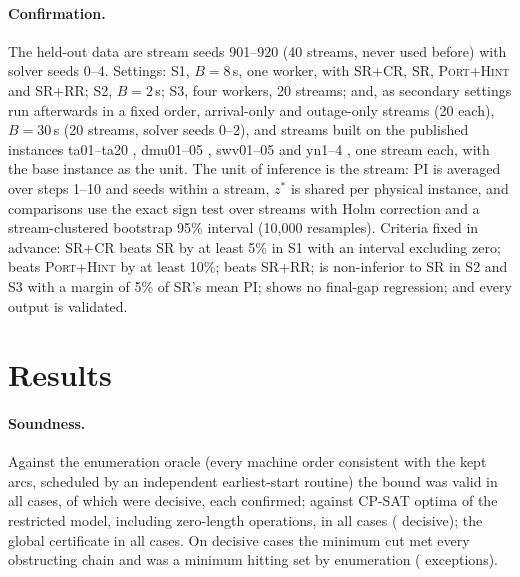 \documentclass[letterpaper]{article} %
\newcommand{\base}{\textsc{SR}}
\newcommand{\crm}{\textsc{SR+CR}}
\newcommand{\rr}{\textsc{SR+RR}}
\newcommand{\ph}{\textsc{Port+Hint}}
\begin{document}
\paragraph{Confirmation.} The held-out data are stream seeds 901--920 (40 streams, never used before) with solver seeds 0--4. Settings: S1, $B=8$\,s, one worker, with \crm, \base, \ph{} and \rr; S2, $B=2$\,s; S3, four workers, 20 streams; and, as secondary settings run afterwards in a fixed order, arrival-only and outage-only streams (20 each), $B=30$\,s (20 streams, solver seeds 0--2), and streams built on the published instances ta01--ta20 \citep{taillard1993}, dmu01--05 \citep{demirkol1998}, swv01--05 \citep{storer1992} and yn1--4 \citep{yamada1992}, one stream each, with the base instance as the unit. The unit of inference is the stream: PI is averaged over steps 1--10 and seeds within a stream, $z^*$ is shared per physical instance, and comparisons use the exact sign test over streams with Holm correction and a stream-clustered bootstrap 95\% interval (10{,}000 resamples). Criteria fixed in advance: \crm{} beats \base{} by at least 5\% in S1 with an interval excluding zero; beats \ph{} by at least 10\%; beats \rr; is non-inferior to \base{} in S2 and S3 with a margin of 5\% of \base's mean PI; shows no final-gap regression; and every output is validated.

\section{Results}

\paragraph{Soundness.} Against the enumeration oracle (every machine order consistent with the kept arcs, scheduled by an independent earliest-start routine) the bound was valid in all \OracleEnumCases{} cases, of which \OracleEnumDecisive{} were decisive, each confirmed; against CP-SAT optima of the restricted model, including zero-length operations, in all \OracleCpsatCases{} cases (\OracleCpsatDecisive{} decisive); the global certificate in all \OracleGlobalCases{} cases. On \OracleCutCases{} decisive cases the minimum cut met every obstructing chain and was a minimum hitting set by enumeration (\OracleCutMisses{} exceptions).
\end{document}
